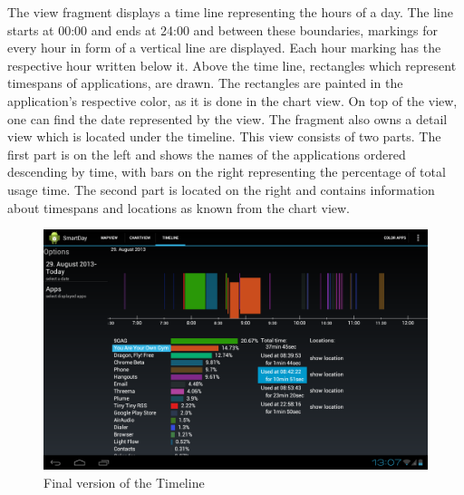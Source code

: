 The  view fragment displays a time line representing the hours of a day. The line starts at 00:00 and ends at 24:00 and between these boundaries, markings for every hour in form of a vertical line are displayed. Each hour marking has the respective hour written below it. Above the time line, rectangles which represent timespans of applications, are drawn. The rectangles are painted in the application's respective color, as it is done in the chart view. On top of the view, one can find the date represented by the view. The fragment also owns a detail view which is located under the timeline. This view consists of two parts. The first part is on the left and shows the names of the applications ordered descending by time, with bars on the right representing the percentage of total usage time. The second part is located on the right and contains information about timespans and locations as known from the chart view.
\begin{figure}[h]
	\caption{Final version of the Timeline}
	\label{fig:timelinefinal}
	\includegraphics[width=\textwidth]{images/Screenshots/vfinal/Screenshot_2013-08-30-13-07-54.png}
\end{figure}

